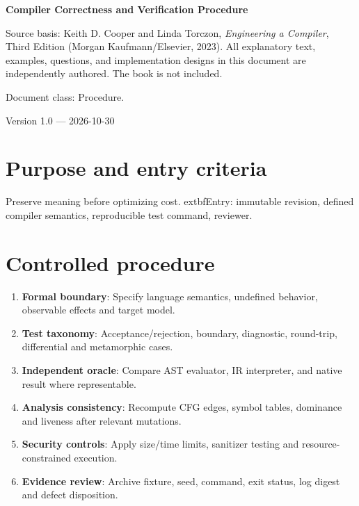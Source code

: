 \documentclass[10pt,letterpaper]{article}
\begin{document}
\hypersetup{pageanchor=false}%
\begin{titlepage}
\centering\vspace*{1.0in}
{\Huge\bfseries\textcolor{CompilerBlue}{Compiler Correctness and Verification Procedure}\par}
\vspace{.22in}{\Large Controlled engineering SOP\par}
\vspace{.4in}{\large Compiler Engineering Documentation Suite\par}
\vfill
\begin{minipage}{.86\linewidth}\small
Source basis: Keith D. Cooper and Linda Torczon, \emph{Engineering a Compiler}, Third Edition (Morgan Kaufmann/Elsevier, 2023). All explanatory text, examples, questions, and implementation designs in this document are independently authored. The book is not included.\par\medskip
Document class: Procedure.
\end{minipage}
\vfill\textcolor{CompilerGray}{Version 1.0 --- 2026-10-30}\par
\end{titlepage}\hypersetup{pageanchor=true}
\tableofcontents\clearpage
\section{Purpose and entry criteria}
Preserve meaning before optimizing cost.
	extbf{Entry:} immutable revision, defined compiler semantics, reproducible test command, reviewer.

\section{Controlled procedure}
\begin{enumerate}
\item \textbf{Formal boundary}: Specify language semantics, undefined behavior, observable effects and target model.
\item \textbf{Test taxonomy}: Acceptance/rejection, boundary, diagnostic, round-trip, differential and metamorphic cases.
\item \textbf{Independent oracle}: Compare AST evaluator, IR interpreter, and native result where representable.
\item \textbf{Analysis consistency}: Recompute CFG edges, symbol tables, dominance and liveness after relevant mutations.
\item \textbf{Security controls}: Apply size/time limits, sanitizer testing and resource-constrained execution.
\item \textbf{Evidence review}: Archive fixture, seed, command, exit status, log digest and defect disposition.
\end{enumerate}
\end{document}
